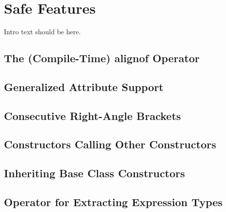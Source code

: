 
\chapter[Safe Features]{Safe Features}\label{ch-safe}

Intro text should be here. 

\renewcommand{\cppxx}{C++11}

\newpage
{}
\section[{\tt alignof}]{The (Compile-Time) {\SecCode alignof} Operator}\label{alignof}


\newpage
\section[Attribute Syntax]{Generalized Attribute Support}\label{attributes}


\newpage
\section[Consecutive {\tt >}s]{Consecutive Right-Angle Brackets}\label{consecutive-right-angle-brackets}


\newpage
\section[Delegating Ctors]{Constructors Calling Other Constructors}\label{delegating-constructors}


\newpage
\section[Inheriting Ctors]{Inheriting Base Class Constructors}\label{ctorinheriting}\label{inheriting-constructors}


\newpage
\section[\tt{decltype}]{Operator for Extracting Expression Types}\label{decltype}


